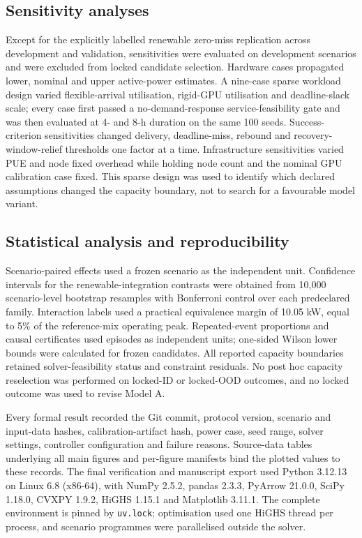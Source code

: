 \documentclass[10pt,a4paper]{article}
\begin{document}
\subsection*{Sensitivity analyses}

Except for the explicitly labelled renewable zero-miss replication across development and validation, sensitivities were evaluated on development scenarios and were excluded from locked candidate selection. Hardware cases propagated lower, nominal and upper active-power estimates. A nine-case sparse workload design varied flexible-arrival utilisation, rigid-GPU utilisation and deadline-slack scale; every case first passed a no-demand-response service-feasibility gate and was then evaluated at 4- and 8-h duration on the same 100 seeds. Success-criterion sensitivities changed delivery, deadline-miss, rebound and recovery-window-relief thresholds one factor at a time. Infrastructure sensitivities varied PUE and node fixed overhead while holding node count and the nominal GPU calibration case fixed. This sparse design was used to identify which declared assumptions changed the capacity boundary, not to search for a favourable model variant.


\subsection*{Statistical analysis and reproducibility}

Scenario-paired effects used a frozen scenario as the independent unit. Confidence intervals for the renewable-integration contrasts were obtained from 10,000 scenario-level bootstrap resamples with Bonferroni control over each predeclared family. Interaction labels used a practical equivalence margin of 10.05 kW, equal to 5\% of the reference-mix operating peak. Repeated-event proportions and causal certificates used episodes as independent units; one-sided Wilson lower bounds were calculated for frozen candidates. All reported capacity boundaries retained solver-feasibility status and constraint residuals. No post hoc capacity reselection was performed on locked-ID or locked-OOD outcomes, and no locked outcome was used to revise Model A.


Every formal result recorded the Git commit, protocol version, scenario and input-data hashes, calibration-artifact hash, power case, seed range, solver settings, controller configuration and failure reasons. Source-data tables underlying all main figures and per-figure manifests bind the plotted values to these records. The final verification and manuscript export used Python 3.12.13 on Linux 6.8 (x86-64), with NumPy 2.5.2, pandas 2.3.3, PyArrow 21.0.0, SciPy 1.18.0, CVXPY 1.9.2, HiGHS 1.15.1 and Matplotlib 3.11.1. The complete environment is pinned by \nolinkurl{uv.lock}; optimisation used one HiGHS thread per process, and scenario programmes were parallelised outside the solver.
\end{document}
